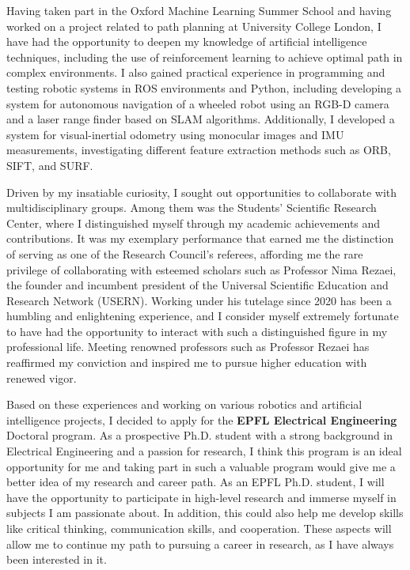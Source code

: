 \documentclass[a4,10pt]{article}
\begin{document}
\begin{large}
\vspace{-0.25cm} \quad Having taken part in the Oxford Machine Learning Summer School and having worked on a project related to path planning at University College London, I have had the opportunity to deepen my knowledge of artificial intelligence techniques, including the use of reinforcement learning to achieve optimal path in complex environments. I also gained practical experience in programming and testing robotic systems in ROS environments and Python, including developing a system for autonomous navigation of a wheeled robot using an RGB-D camera and a laser range finder based on SLAM algorithms. Additionally, I developed a system for visual-inertial odometry using monocular images and IMU measurements, investigating different feature extraction methods such as ORB, SIFT, and SURF. \par
\vspace{-0.25cm} \quad Driven by my insatiable curiosity, I sought out opportunities to collaborate with multidisciplinary groups. Among them was the Students' Scientific Research Center, where I distinguished myself through my academic achievements and contributions. It was my exemplary performance that earned me the distinction of serving as one of the Research Council's referees, affording me the rare privilege of collaborating with esteemed scholars such as Professor Nima Rezaei, the founder and incumbent president of the Universal Scientific Education and Research Network (USERN). Working under his tutelage since 2020 has been a humbling and enlightening experience, and I consider myself extremely fortunate to have had the opportunity to interact with such a distinguished figure in my professional life. Meeting renowned professors such as Professor Rezaei has reaffirmed my conviction and inspired me to pursue higher education with renewed vigor.\par
\quad Based on these experiences and working on various robotics and artificial intelligence projects, I decided to apply for the  \textbf{EPFL Electrical Engineering} Doctoral program. As a prospective Ph.D. student with a strong background in Electrical Engineering and a passion for research, I think this program is an ideal opportunity for me and taking part in such a valuable program would give me a better idea of my research and career path. As an EPFL Ph.D. student, I will have the opportunity to participate in high-level research and immerse myself in subjects I am passionate about. In addition, this could also help me develop skills like critical thinking, communication skills, and cooperation. These aspects will allow me to continue my path to pursuing a career in research, as I have always been interested in it. \par

\end{large}
\end{document}
